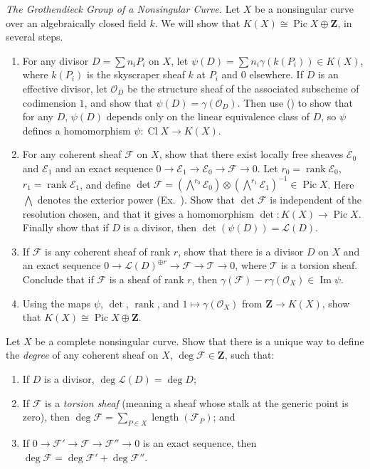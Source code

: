 { \emph{The Grothendieck Group of a Nonsingular Curve.} Let $X$ be a nonsingular curve over an algebraically closed field $k$. We will show that $K(X)\cong\operatorname{Pic}X\oplus\mathbf Z$, in several steps.
\begin{enumerate}[label=(\alph*),leftmargin=2.7em,itemsep=0pt,topsep=1pt,parsep=0pt]
\item For any divisor $D=\sum n_iP_i$ on $X$, let $\psi(D)=\sum n_i\gamma(k(P_i))\in K(X)$, where $k(P_i)$ is the skyscraper sheaf $k$ at $P_i$ and $0$ elsewhere. If $D$ is an effective divisor, let $\mathcal O_D$ be the structure sheaf of the associated subscheme of codimension $1$, and show that $\psi(D)=\gamma(\mathcal O_D)$. Then use () to show that for any $D$, $\psi(D)$ depends only on the linear equivalence class of $D$, so $\psi$ defines a homomorphism $\psi\colon\operatorname{Cl}X\to K(X)$.
\item For any coherent sheaf $\mathcal F$ on $X$, show that there exist locally free sheaves $\mathcal E_0$ and $\mathcal E_1$ and an exact sequence $0\to\mathcal E_1\to\mathcal E_0\to\mathcal F\to0$. Let $r_0=\operatorname{rank}\mathcal E_0$, $r_1=\operatorname{rank}\mathcal E_1$, and define $\det\mathcal F=(\bigwedge^{r_0}\mathcal E_0)\otimes(\bigwedge^{r_1}\mathcal E_1)^{-1}\in\operatorname{Pic}X$. Here $\bigwedge$ denotes the exterior power (Ex.\ ). Show that $\det\mathcal F$ is independent of the resolution chosen, and that it gives a homomorphism $\det\colon K(X)\to\operatorname{Pic}X$. Finally show that if $D$ is a divisor, then $\det(\psi(D))=\mathcal L(D)$.
\item If $\mathcal F$ is any coherent sheaf of rank $r$, show that there is a divisor $D$ on $X$ and an exact sequence $0\to\mathcal L(D)^{\oplus r}\to\mathcal F\to\mathcal T\to0$, where $\mathcal T$ is a torsion sheaf. Conclude that if $\mathcal F$ is a sheaf of rank $r$, then $\gamma(\mathcal F)-r\gamma(\mathcal O_X)\in\operatorname{Im}\psi$.
\item Using the maps $\psi$, $\det$, $\operatorname{rank}$, and $1\mapsto\gamma(\mathcal O_X)$ from $\mathbf Z\to K(X)$, show that $K(X)\cong\operatorname{Pic}X\oplus\mathbf Z$.
\end{enumerate}

 Let $X$ be a complete nonsingular curve. Show that there is a unique way to define the \emph{degree} of any coherent sheaf on $X$, $\deg\mathcal F\in\mathbf Z$, such that:
\begin{enumerate}[label=(\arabic*),leftmargin=2.7em,itemsep=0pt,topsep=1pt,parsep=0pt]
\item If $D$ is a divisor, $\deg\mathcal L(D)=\deg D$;
\item If $\mathcal F$ is a \emph{torsion sheaf} (meaning a sheaf whose stalk at the generic point is zero), then $\deg\mathcal F=\sum_{P\in X}\operatorname{length}(\mathcal F_P)$; and
\item If $0\to\mathcal F'\to\mathcal F\to\mathcal F''\to0$ is an exact sequence, then $\deg\mathcal F=\deg\mathcal F'+\deg\mathcal F''$.
\end{enumerate}

}
